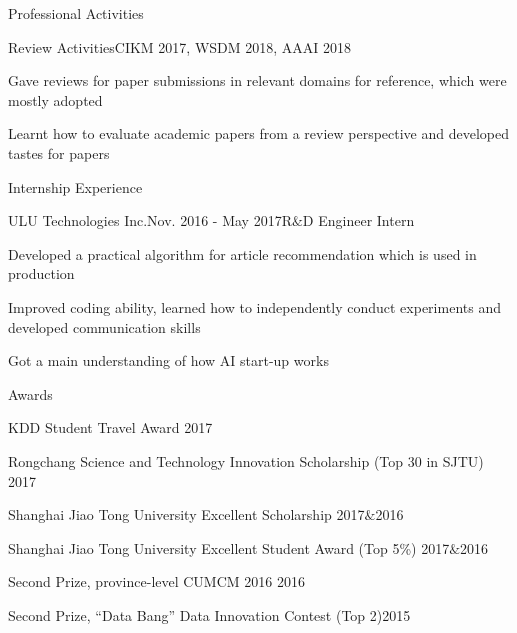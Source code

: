 \documentclass{resume} %
\begin{document}
\begin{rSection}{Professional Activities}
\begin{rSubsection}{Review Activities}{CIKM 2017, WSDM 2018, AAAI 2018}{}{}
\item Gave reviews for paper submissions in relevant domains for reference, which were mostly adopted
\item Learnt how to evaluate academic papers from a review perspective and developed tastes for papers
\end{rSubsection}
\end{rSection}


\begin{rSection}{Internship Experience}
\begin{rSubsection}{ULU Technologies Inc.}{Nov. 2016 - May 2017}{R$\&$D  Engineer Intern}{}
\item Developed a practical algorithm for article recommendation which is used in production
\item Improved coding ability, learned how to independently conduct experiments and developed communication skills
\item Got a main understanding of how AI start-up works
\end{rSubsection}
\end{rSection}



\begin{rSection}{Awards}
\begin{rSubsection}{}{}{}{}
\item KDD Student Travel Award \hfill{2017}
\item Rongchang Science and Technology Innovation Scholarship (Top 30 in SJTU) \hfill{2017}
\item Shanghai Jiao Tong University Excellent Scholarship \hfill{2017$\&$2016}
\item Shanghai Jiao Tong University Excellent Student Award (Top 5\%)  \hfill{2017$\&$2016}
\item Second Prize, province-level CUMCM 2016 \hfill{2016}
\item Second Prize, ``Data Bang'' Data Innovation Contest (Top 2)\hfill{2015} 
\end{rSubsection}
\end{rSection}
\end{document}
